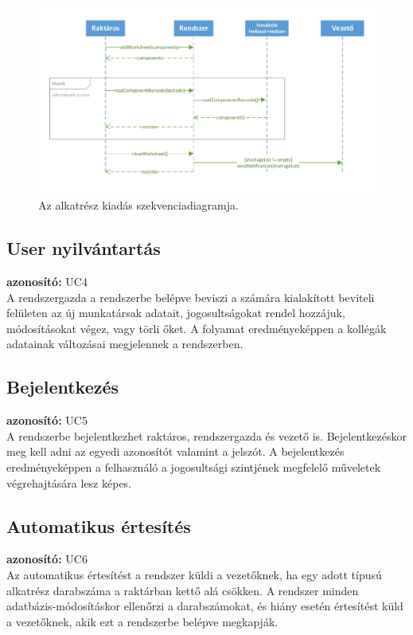 \documentclass[12pt]{article}\usepackage[left=20mm,right=20mm,top=15mm,bottom=20mm]{geometry}
\begin{document}
\begin{figure}[!h]
    \centering
        \includegraphics[width=\textwidth]{kepek/alkatresz_kiadas_SD.pdf}
        \caption{Az alkatrész kiadás szekvenciadiagramja.}
\end{figure}

\subsection{User nyilvántartás}
\textbf{azonosító: } UC4 \\
A rendszergazda a rendszerbe belépve beviszi a számára kialakított beviteli felületen az új munkatársak adatait, jogosultságokat rendel hozzájuk, módosításokat végez, vagy törli őket. 
A folyamat eredményeképpen a kollégák adatainak változásai megjelennek a rendszerben.

\subsection{Bejelentkezés}
\textbf{azonosító: } UC5 \\
A rendszerbe bejelentkezhet raktáros, rendszergazda és vezető is.
Bejelentkezéskor meg kell adni az egyedi azonosítót valamint a jelszót.
A bejelentkezés eredményeképpen a felhasználó a jogosultsági szintjének megfelelő műveletek végrehajtására lesz képes.

\subsection{Automatikus értesítés}
\textbf{azonosító: } UC6 \\
Az automatikus értesítést a rendszer küldi a vezetőknek, ha egy adott típusú alkatrész darabszáma a raktárban kettő alá csökken.
A rendszer minden adatbázis-módosításkor ellenőrzi a darabszámokat, és hiány esetén értesítést küld a vezetőknek, akik ezt a rendszerbe belépve megkapják.
\end{document}
